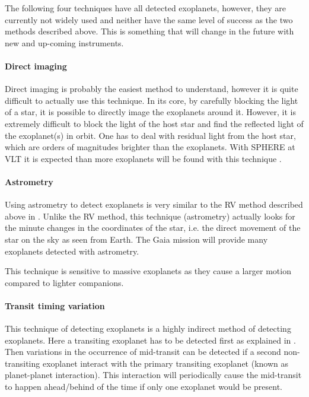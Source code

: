 The following four techniques have all detected exoplanets, however, they are currently not widely
used and neither have the same level of success as the two methods described above. This is
something that will change in the future with new and up-coming instruments.

\paragraph{Direct imaging}

Direct imaging is probably the easiest method to understand, however it is quite difficult to
actually use this technique. In its core, by carefully blocking the light of a star, it is possible
to directly image the exoplanets around it. However, it is extremely difficult to block the light of
the host star and find the reflected light of the exoplanet(s) in orbit. One has to deal with
residual light from the host star, which are orders of magnitudes brighter than the exoplanets. With
SPHERE at VLT it is expected than more exoplanets will be found with this technique
\citep{Beuzit2008}.


\paragraph{Astrometry}

Using astrometry to detect exoplanets is very similar to the RV method described above in
. Unlike the RV method, this technique (astrometry) actually looks for the minute
changes in the coordinates of the star, i.e. the direct movement of the star on the sky as seen from
Earth. The Gaia mission \citep{GAIA} will provide many exoplanets detected with astrometry.

This technique is sensitive to massive exoplanets as they cause a larger motion compared to lighter
companions.


\paragraph{Transit timing variation}

This technique of detecting exoplanets is a highly indirect method of detecting exoplanets. Here a
transiting exoplanet has to be detected first as explained in . Then
variations in the occurrence of mid-transit can be detected if a second non-transiting exoplanet
interact with the primary transiting exoplanet (known as planet-planet interaction). This
interaction will periodically cause the mid-transit to happen ahead/behind of the time if only one
exoplanet would be present.

